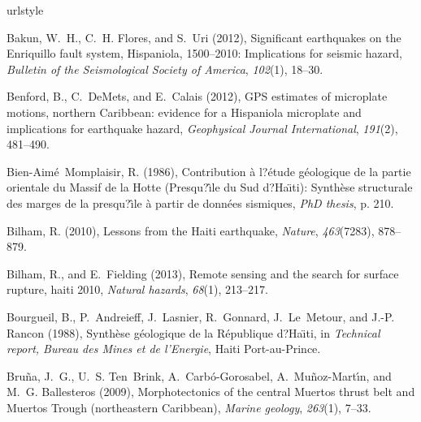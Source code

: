 \documentclass[linenumbers,draft]{agujournal}
\begin{document}
\begin{thebibliography}{62}
\providecommand{\natexlab}[1]{#1}
\expandafter\ifx\csname urlstyle\endcsname\relax
  \providecommand{\doi}[1]{doi:\discretionary{}{}{}#1}\else
  \providecommand{\doi}{doi:\discretionary{}{}{}\begingroup
  \urlstyle{rm}\Url}\fi

Bakun, W.~H., C.~H. Flores, and S.~Uri (2012), Significant earthquakes on the
  {Enriquillo fault system, Hispaniola, 1500--2010: Implications} for seismic
  hazard, \textit{Bulletin of the Seismological Society of America},
  \textit{102}(1), 18--30.

Benford, B., C.~DeMets, and E.~Calais (2012), {GPS} estimates of microplate
  motions, northern {Caribbean}: {evidence for a Hispaniola microplate and
  implications for earthquake hazard}, \textit{Geophysical Journal
  International}, \textit{191}(2), 481--490.

Bien-Aim{\'e}~Momplaisir, R. (1986), {Contribution {\`a} l?{\'e}tude
  g{\'e}ologique de la partie orientale du Massif de la Hotte (Presqu?{\^\i}le
  du Sud d?Ha{\"\i}ti): Synth{\`e}se structurale des marges de la
  presqu?{\^\i}le {\`a} partir de donn{\'e}es sismiques}, \textit{PhD thesis},
  p. 210.

Bilham, R. (2010), {Lessons from the Haiti earthquake}, \textit{Nature},
  \textit{463}(7283), 878--879.

Bilham, R., and E.~Fielding (2013), Remote sensing and the search for surface
  rupture, haiti 2010, \textit{Natural hazards}, \textit{68}(1), 213--217.

Bourgueil, B., P.~Andreieff, J.~Lasnier, R.~Gonnard, J.~Le~Metour, and J.-P.
  Rancon (1988), {Synth{\`e}se g{\'e}ologique de la R{\'e}publique
  d?Ha{\"\i}ti}, in \textit{Technical report, Bureau des Mines et de
  l'Energie}, Haiti Port-au-Prince.

Bru{\~n}a, J.~G., U.~S. Ten~Brink, A.~Carb{\'o}-Gorosabel,
  A.~Mu{\~n}oz-Mart{\'\i}n, and M.~G. Ballesteros (2009), {Morphotectonics of
  the central Muertos thrust belt and Muertos Trough (northeastern Caribbean)},
  \textit{Marine geology}, \textit{263}(1), 7--33.


\end{thebibliography}
\end{document}
